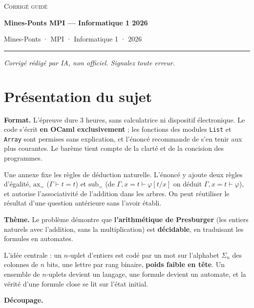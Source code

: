\documentclass[11pt,a4paper]{article}
\begin{document}
\thispagestyle{plain}
\begin{center}
  {\small\scshape Corrigé guidé}\par\smallskip
  {\LARGE\bfseries Mines-Ponts MPI — Informatique 1 2026\par}\medskip
  {\large Mines-Ponts · MPI · Informatique 1 · 2026\par}
\end{center}
\vspace{2pt}\hrule\vspace{8pt}

\emph{Corrigé rédigé par IA, non officiel. Signalez toute erreur.}

\hypertarget{pruxe9sentation-du-sujet}{%
\section{Présentation du sujet}\label{pruxe9sentation-du-sujet}}

\textbf{Format.} L'épreuve dure 3 heures, sans calculatrice ni dispositif électronique. Le code s'écrit \textbf{en OCaml exclusivement} ; les fonctions des modules \texttt{List} et \texttt{Array} sont permises sans explication, et l'énoncé recommande de s'en tenir aux plus courantes. Le barème tient compte de la clarté et de la concision des programmes.

Une annexe fixe les règles de déduction naturelle. L'énoncé y ajoute deux règles d'égalité, \({\mathrm{ax}}_=\) (\(\Gamma\vdash t=t\)) et \({\mathrm{sub}}_=\) (de \(\Gamma,x=t\vdash\varphi[t/x]\) on déduit \(\Gamma,x=t\vdash\varphi\)), et autorise l'associativité de l'addition dans les arbres. On peut réutiliser le résultat d'une question antérieure sans l'avoir établi.

\textbf{Thème.} Le problème démontre que \textbf{l'arithmétique de Presburger} (les entiers naturels avec l'addition, sans la multiplication) est \textbf{décidable}, en traduisant les formules en automates.

L'idée centrale : un \(n\)-uplet d'entiers est codé par un mot sur l'alphabet \(\Sigma_n\) des colonnes de \(n\) bits, une lettre par rang binaire, \textbf{poids faible en tête}. Un ensemble de \(n\)-uplets devient un langage, une formule devient un automate, et la vérité d'une formule close se lit sur l'état initial.

\textbf{Découpage.}
\end{document}
